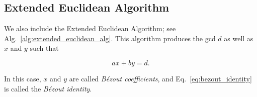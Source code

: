 \subsection{Extended Euclidean Algorithm}

We also include the Extended Euclidean Algorithm;
see Alg.~\ref{alg:extended_euclidean_alg}.
This algorithm produces the gcd $d$ as well as $x$ and $y$ such that

\begin{equation}
    ax + by = d.
    \label{eq:bezout_identity}
\end{equation}



\noindent
In this case, $x$ and $y$ are called \emph{B\'{e}zout coefficients},
and Eq.~\eqref{eq:bezout_identity} is called the \emph{B\'{e}zout identity}.

